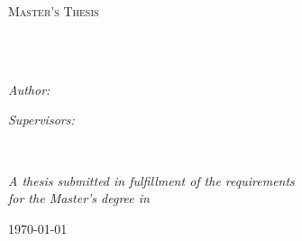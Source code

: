 \documentclass[
11pt, %
english, %
singlespacing, %
headsepline, %
]{MastersDoctoralThesis} %
\author{Asier \textsc{Rodríguez Escalante}} %
\begin{document}
\frontmatter %

\pagestyle{plain} %


\begin{titlepage}
\begin{center}

\vspace*{.06\textheight}
{\scshape\LARGE \univname\par}\vspace{1.5cm} %
\textsc{\Large Master's Thesis}\\[0.5cm] %

\HRule \\[0.4cm] %
{\huge \bfseries \ttitle\par}\vspace{0.4cm} %
\HRule \\[1.5cm] %
 
\begin{minipage}[t]{0.4\textwidth}
\begin{flushleft} \large
\emph{Author:}\\
\href{http://www.johnsmith.com}{\authorname} %
\end{flushleft}
\end{minipage}
\begin{minipage}[t]{0.4\textwidth}
\begin{flushright} \large
\emph{Supervisors:} \\
\href{http://www.jamessmith.com}{\supname} %
\end{flushright}
\end{minipage}\\[3cm]
 
\vfill

\large \textit{A thesis submitted in fulfillment of the requirements\\ for the  Master's degree in \degreename}\\[0.3cm] %
 
\vfill

{\large \today}\\[4cm] %
 
\vfill
\end{center}
\end{titlepage}
\end{document}

